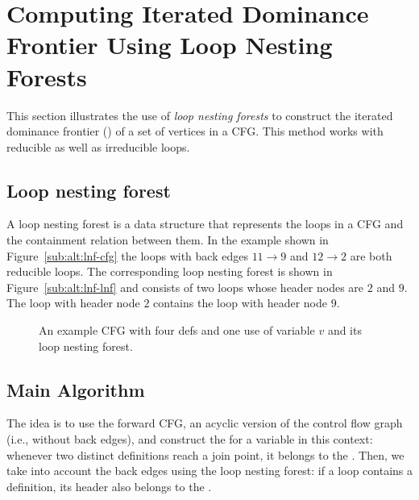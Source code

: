 {\begin{algorithm}
\end{algorithm}

\section{Computing Iterated Dominance Frontier Using Loop Nesting Forests}
\label{section:alternative_ssa_construction_algorithms:loop}
This section illustrates the use of \emph{loop nesting forests} to construct the iterated dominance frontier (\iDF) of a set of vertices in a CFG. 
This method works with reducible as well as irreducible loops.


\subsection{Loop nesting forest}%
\label{sec:loop_nesting_forest}A loop nesting forest is a data structure that represents the loops in a CFG and the containment relation between them. 
In the example shown in Figure~\ref{sub:alt:lnf-cfg} the loops with back edges $11 \rightarrow 9$ and $12 \rightarrow 2$ are both reducible loops. 
The corresponding loop nesting forest is shown in Figure~\ref{sub:alt:lnf-lnf} and consists of two loops whose header nodes are $2$ and $9$. 
The loop with header node $2$ contains the loop with header node $9$.

\begin{figure}[t]     \hfill     {}     \hfill     {}     \hfill\null     \caption{An example CFG with four defs and one use of variable $v$ and its loop nesting forest.}
\label{fig:lnf} \end{figure} 

\subsection{Main Algorithm}
The idea is to use the forward CFG, an acyclic version of the control flow graph (i.e., without back edges), and construct the \iDF for a variable in this context:  whenever two distinct definitions reach a join point, it belongs to the \iDF. 
Then, we take into account the back edges using the loop nesting forest:  if a loop contains a definition, its header also belongs to the \iDF.

\medskip

}

